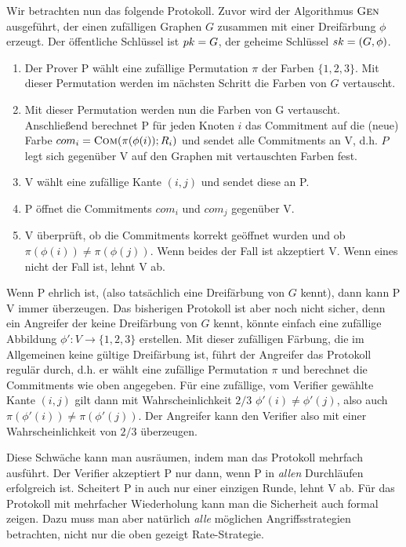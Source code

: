 Wir betrachten nun das folgende Protokoll. Zuvor wird der Algorithmus $\textsc{Gen}$ ausgeführt, der einen zufälligen Graphen $G$ zusammen mit einer Dreifärbung $\phi$ erzeugt. Der öffentliche Schlüssel ist $pk = G$, der geheime Schlüssel $sk = (G, \phi)$.
\begin{enumerate}
	\item Der Prover P wählt eine zufällige Permutation $\pi$ der Farben $\{1,2,3\}$. Mit dieser Permutation werden im nächsten Schritt die Farben von $G$ vertauscht.
	\item Mit dieser Permutation werden nun die Farben von G vertauscht. Anschließend berechnet P für jeden Knoten $i$ das Commitment auf die (neue) Farbe $com_i = \textsc{Com}(\pi(\phi(i)); R_i)$ und sendet alle Commitments an V, d.h. $P$ legt sich gegenüber V auf den Graphen mit vertauschten Farben fest.
	\item V wählt eine zufällige Kante $(i,j)$ und sendet diese an P.
	\item P öffnet die Commitments $com_i$ und $com_j$ gegenüber V.
	\item V überprüft, ob die Commitments korrekt geöffnet wurden und ob $\pi(\phi(i)) \neq \pi(\phi(j))$. Wenn beides der Fall ist akzeptiert V. Wenn eines nicht der Fall ist, lehnt V ab.
\end{enumerate}

Wenn P ehrlich ist, (also tatsächlich eine Dreifärbung von $G$ kennt), dann kann P V immer überzeugen.
Das bisherigen Protokoll ist aber noch nicht sicher, denn ein Angreifer der keine Dreifärbung von $G$ kennt, könnte einfach eine zufällige Abbildung $\phi': V \rightarrow \{1,2,3\}$ erstellen.
Mit dieser zufälligen Färbung, die im Allgemeinen keine gültige Dreifärbung ist, führt der Angreifer das Protokoll regulär durch, d.h. er wählt eine zufällige Permutation $\pi$ und berechnet die Commitments wie oben angegeben.
Für eine zufällige, vom Verifier gewählte Kante $(i,j)$ gilt dann mit Wahrscheinlichkeit $2/3$ $\phi'(i) \neq \phi'(j)$, also auch $\pi(\phi'(i)) \neq \pi(\phi'(j))$. Der Angreifer kann den Verifier also mit einer Wahrscheinlichkeit von $2/3$ überzeugen.

Diese Schwäche kann man ausräumen, indem man das Protokoll mehrfach ausführt. Der Verifier akzeptiert P nur dann, wenn P in \emph{allen} Durchläufen erfolgreich ist. Scheitert P in auch nur einer einzigen Runde, lehnt V ab. Für das Protokoll mit mehrfacher Wiederholung kann man die Sicherheit auch formal zeigen. Dazu muss man aber natürlich \emph{alle} möglichen Angriffsstrategien betrachten, nicht nur die oben gezeigt Rate-Strategie.\\

